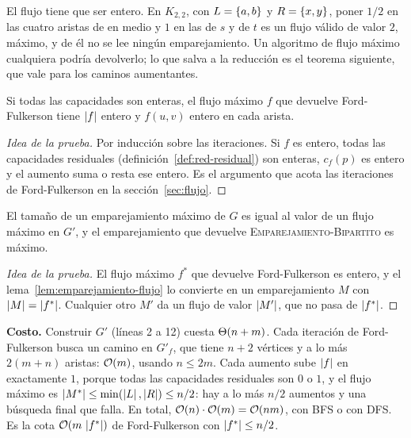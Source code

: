 \documentclass[11pt,letterpaper]{article}
\begin{document}
\begin{ojo}
  El flujo tiene que ser entero. En $K_{2,2}$, con $L = \left\{ a, b \right\}$ y
  $R = \left\{ x, y \right\}$, poner $1/2$ en las cuatro aristas de en medio y
  $1$ en las de $s$ y de $t$ es un flujo válido de valor $2$, máximo,
  y de él no se lee ningún emparejamiento. Un algoritmo de flujo
  máximo cualquiera podría devolverlo; lo que salva a la reducción es
  el teorema siguiente, que vale para los caminos aumentantes.
\end{ojo}

\begin{teorema}[Integralidad]
  \label{teo:emparejamiento-integralidad}
  Si todas las capacidades son enteras, el flujo máximo $f$ que
  devuelve Ford-Fulkerson tiene $\left\lvert f \right\rvert$ entero y $f(u, v)$ entero
  en cada arista.
\end{teorema}

\begin{proof}[Idea de la prueba]
  Por inducción sobre las iteraciones. Si $f$ es entero, todas las
  capacidades residuales (definición~\ref{def:red-residual}) son
  enteras, $c_f(p)$ es entero y el aumento suma o resta ese entero.
  Es el argumento que acota las iteraciones de Ford-Fulkerson en la
  sección~\ref{sec:flujo}.
\end{proof}

\begin{corolario}
  \label{cor:emparejamiento-flujo}
  El tamaño de un emparejamiento máximo de $G$ es igual al valor de un
  flujo máximo en $G'$, y el emparejamiento que devuelve
  \textup{\textsc{Emparejamiento-Bipartito}} es máximo.
\end{corolario}

\begin{proof}[Idea de la prueba]
  El flujo máximo $f^*$ que devuelve Ford-Fulkerson es entero, y el
  lema~\ref{lem:emparejamiento-flujo} lo convierte en un
  emparejamiento $M$ con $\left\lvert M \right\rvert = \left\lvert f^* \right\rvert$. Cualquier otro $M'$
  da un flujo de valor $\left\lvert M' \right\rvert$, que no pasa de $\left\lvert f^* \right\rvert$.
\end{proof}

\textbf{Costo.} Construir $G'$ (líneas 2 a 12) cuesta $\Theta\!\left(n + m\right)$.
Cada iteración de Ford-Fulkerson busca un camino en $G'_f$, que tiene
$n + 2$ vértices y a lo más $2(m + n)$ aristas: $\mathcal{O}\!\left(m\right)$, usando
$n \le 2m$. Cada aumento sube $\left\lvert f \right\rvert$ en exactamente $1$, porque
todas las capacidades residuales son $0$ o $1$, y el flujo máximo es
$\left\lvert M^* \right\rvert \le \min(\left\lvert L \right\rvert, \left\lvert R \right\rvert) \le n/2$: hay a lo más $n/2$
aumentos y una búsqueda final que falla. En total,
$\mathcal{O}\!\left(n\right) \cdot \mathcal{O}\!\left(m\right) = \mathcal{O}\!\left(nm\right)$, con BFS o con DFS. Es la cota
$\mathcal{O}\!\left(m\,\left\lvert f^* \right\rvert\right)$ de Ford-Fulkerson con $\left\lvert f^* \right\rvert \le n/2$.
\end{document}
